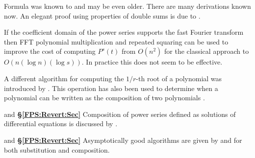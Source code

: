  Formula  was
known to {\Euler} \cite{Euler1748-zr} and may be even older.  There
are many derivations known now.  An elegant proof using properties of
double sums is due to {\Holdt} \cite{Von_Holdt1965-rx}.

If the coefficient domain of the power series supports the fast
Fourier transform then FFT polynomial multiplication and repeated
squaring can be used to improve the cost of computing $P^s(t)$ from
$O(n^2)$ for the classical approach to $O(n (\log n)(\log s))$.  In
practice this does not seem to be effective.

A different algorithm for computing the $1/r$-th root of a polynomial 
was introduced by {\Yun} \cite{Yun1976-pr}.  This operation has also been 
used to determine when a polynomial can be written as the composition of 
two polynomials \cite{Kozen1989-ns,Von_zur_Gathen1987-xe}.

 and {\bf \S\ref{FPS:Revert:Sec}}
Composition of power series defined as solutions of differential
equations is discussed by {\Norman} \cite{Norman1975-xu}.

 and {\bf \S\ref{FPS:Revert:Sec}}
Asymptotically good algorithms are given by {\Brent} and {\Kung}
\cite{Brent1978-zp} for both substitution and composition.

\normalsize

